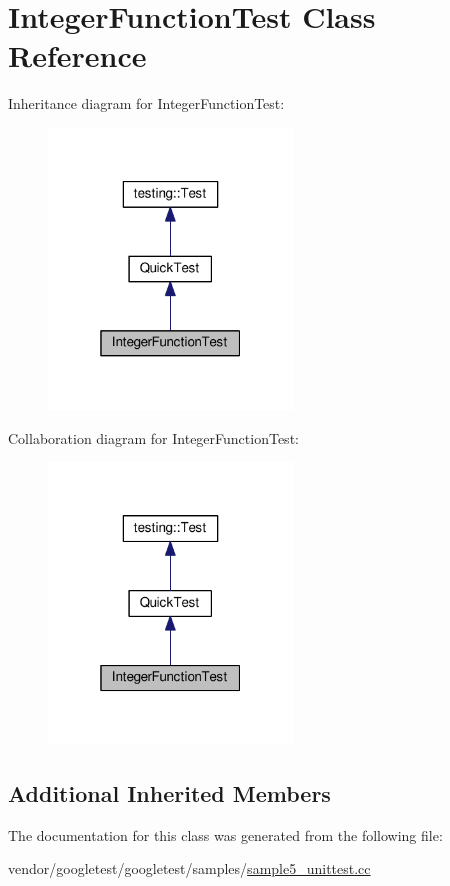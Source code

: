\hypertarget{classIntegerFunctionTest}{}\section{Integer\+Function\+Test Class Reference}
\label{classIntegerFunctionTest}


Inheritance diagram for Integer\+Function\+Test\+:
\nopagebreak
\begin{figure}[H]
\begin{center}
\leavevmode
\includegraphics[width=184pt]{classIntegerFunctionTest__inherit__graph}
\end{center}
\end{figure}


Collaboration diagram for Integer\+Function\+Test\+:
\nopagebreak
\begin{figure}[H]
\begin{center}
\leavevmode
\includegraphics[width=184pt]{classIntegerFunctionTest__coll__graph}
\end{center}
\end{figure}
\subsection*{Additional Inherited Members}


The documentation for this class was generated from the following file\+:\begin{DoxyCompactItemize}
\item 
vendor/googletest/googletest/samples/\hyperlink{sample5__unittest_8cc}{sample5\+\_\+unittest.\+cc}\end{DoxyCompactItemize}
